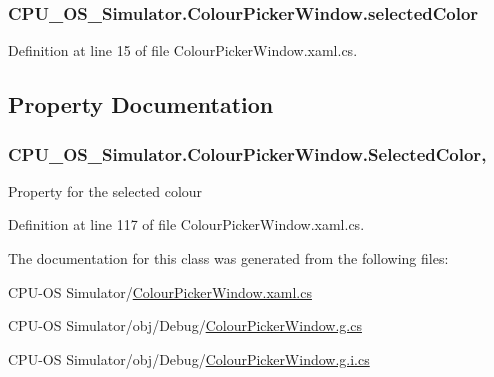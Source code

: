 \subsubsection[{selected\+Color}]{ C\+P\+U\+\_\+\+O\+S\+\_\+\+Simulator.\+Colour\+Picker\+Window.\+selected\+Color\hspace{0.3cm}{\ttfamily [private]}}\label{class_c_p_u___o_s___simulator_1_1_colour_picker_window_a1c1653bebad209bd313da5a18ecea9bc}


Definition at line 15 of file Colour\+Picker\+Window.\+xaml.\+cs.



\subsection{Property Documentation}
\hypertarget{class_c_p_u___o_s___simulator_1_1_colour_picker_window_a4e51070f2e58d178bf773acb4200e76e}{}
\subsubsection[{Selected\+Color}]{ C\+P\+U\+\_\+\+O\+S\+\_\+\+Simulator.\+Colour\+Picker\+Window.\+Selected\+Color\hspace{0.3cm}{\ttfamily [get]}, {\ttfamily [set]}}\label{class_c_p_u___o_s___simulator_1_1_colour_picker_window_a4e51070f2e58d178bf773acb4200e76e}


Property for the selected colour 



Definition at line 117 of file Colour\+Picker\+Window.\+xaml.\+cs.



The documentation for this class was generated from the following files\+:\begin{DoxyCompactItemize}
\item 
C\+P\+U-\/\+O\+S Simulator/\hyperlink{_colour_picker_window_8xaml_8cs}{Colour\+Picker\+Window.\+xaml.\+cs}\item 
C\+P\+U-\/\+O\+S Simulator/obj/\+Debug/\hyperlink{_debug_2_colour_picker_window_8g_8cs}{Colour\+Picker\+Window.\+g.\+cs}\item 
C\+P\+U-\/\+O\+S Simulator/obj/\+Debug/\hyperlink{_debug_2_colour_picker_window_8g_8i_8cs}{Colour\+Picker\+Window.\+g.\+i.\+cs}\end{DoxyCompactItemize}
